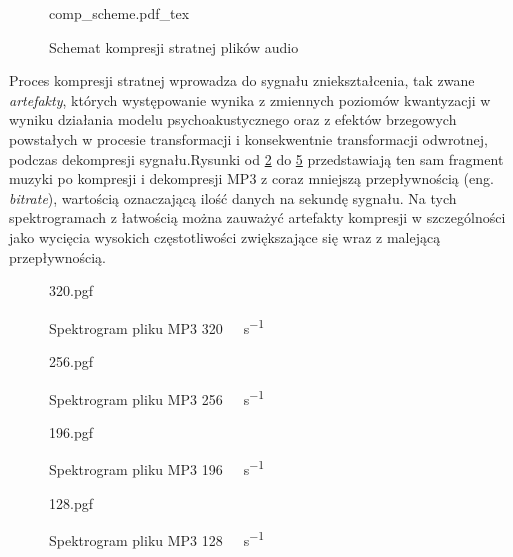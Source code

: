 \documentclass[12pt]{oska}
\begin{document}
\begin{figure}[!tbh]
  \centering
  {comp_scheme.pdf_tex}
  \caption{Schemat kompresji stratnej plików audio}
  \label{fig:comp_scheme}
\end{figure}

Proces kompresji stratnej wprowadza do sygnału zniekształcenia, tak zwane
\textit{artefakty}, których występowanie wynika z zmiennych poziomów
kwantyzacji w wyniku działania modelu psychoakustycznego oraz z efektów
brzegowych powstałych w procesie transformacji i konsekwentnie transformacji
odwrotnej, podczas dekompresji sygnału.Rysunki od \ref{fig:mp3_320} do \ref{fig:mp3_128}
przedstawiają ten sam fragment muzyki po kompresji i dekompresji MP3 z coraz
mniejszą przepływnością (eng. \textit{bitrate}), wartością oznaczającą ilość
danych na sekundę sygnału. Na tych spektrogramach z łatwością można zauważyć
artefakty kompresji w szczególności jako wycięcia wysokich częstotliwości
zwiększające się wraz z malejącą przepływnością.
\begin{figure}[!tbh]
  \centering
  {320.pgf}
  \caption{Spektrogram pliku MP3 \SI{320}{\kilo\bit\per\second}}
  \label{fig:mp3_320}
\end{figure}
\begin{figure}[!tbh]
  \centering
  {256.pgf}
  \caption{Spektrogram pliku MP3 \SI{256}{\kilo\bit\per\second}}
  \label{fig:mp3_256}
\end{figure}
\begin{figure}[!tbh]
  \centering
  {196.pgf}
  \caption{Spektrogram pliku MP3 \SI{196}{\kilo\bit\per\second}}
  \label{fig:mp3_196}
\end{figure}
\begin{figure}[!tbh]
  \centering
  {128.pgf}
  \caption{Spektrogram pliku MP3 \SI{128}{\kilo\bit\per\second}}
  \label{fig:mp3_128}
\end{figure}
\end{document}
